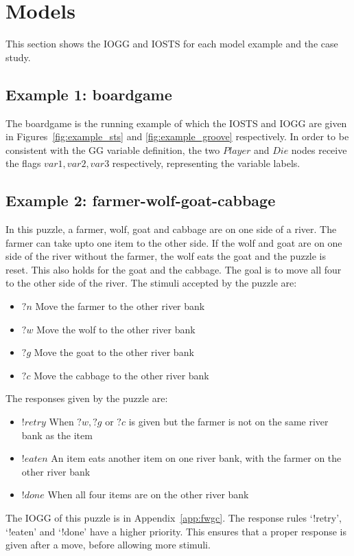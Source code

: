 \section{Models}
This section shows the IOGG and IOSTS for each model example and the case study. 

\subsection{Example 1: boardgame}
The boardgame is the running example of which the IOSTS and IOGG are given in Figures~\ref{fig:example_sts} and \ref{fig:example_groove} respectively. In order to be consistent with the GG variable definition, the two $Player$ and $Die$ nodes receive the flags $\mathit{var1, var2, var3}$ respectively, representing the variable labels.

\subsection{Example 2: farmer-wolf-goat-cabbage}
In this puzzle, a farmer, wolf, goat and cabbage are on one side of a river. The farmer can take upto one item to the other side. If the wolf and goat are on one side of the river without the farmer, the wolf eats the goat and the puzzle is reset. This also holds for the goat and the cabbage. The goal is to move all four to the other side of the river. The stimuli accepted by the puzzle are:
\begin{itemize}
\item $?n$ Move the farmer to the other river bank
\item $?w$ Move the wolf to the other river bank
\item $?g$ Move the goat to the other river bank
\item $?c$ Move the cabbage to the other river bank
\end{itemize}
The responses given by the puzzle are:
\begin{itemize}
\item $!retry$ When $?w, ?g$ or $?c$ is given but the farmer is not on the same river bank as the item
\item $!eaten$ An item eats another item on one river bank, with the farmer on the other river bank 
\item $!done$ When all four items are on the other river bank
\end{itemize}

The IOGG of this puzzle is in Appendix~\ref{app:fwgc}. The response rules `!retry', `!eaten' and `!done' have a higher priority. This ensures that a proper response is given after a move, before allowing more stimuli.

